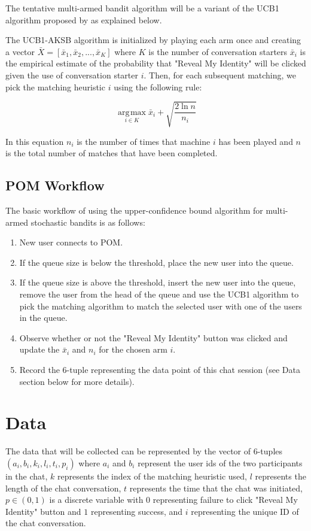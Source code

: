 \documentclass{report}
\DeclareMathOperator*{\argmax}{\arg\!\max}
\begin{document}
The tentative multi-armed bandit algorithm will be a variant of the UCB1 algorithm proposed by \citep{auer02} as explained below.

The UCB1-AKSB algorithm is initialized by playing each arm once and creating a vector $\bar{X} = [\bar{x}_1, \bar{x}_2, ..., \bar{x}_K]$ where $K$ is the number of conversation starters
$\bar{x}_i$ is the empirical estimate of the probability that "Reveal My Identity" will be clicked given the use of conversation starter $i$. Then, for each subsequent matching, we pick the matching heuristic $i$ using the following rule: 

$$ \underset{i \in{K}}{\argmax{}} \bar{x}_i + \sqrt{\frac{2\ln{n}}{n_i}}$$

In this equation $n_i$ is the number of times that machine $i$ has been played and $n$ is the total number of matches that have been completed.

\section{POM Workflow}

The basic workflow of using the upper-confidence bound algorithm for multi-armed stochastic bandits is as follows: 

\begin{enumerate}
\item New user connects to POM.
\item If the queue size is below the threshold, place the new user into the queue.
\item If the queue size is above the threshold, insert the new user into the queue, remove the user from the head of the queue and use the UCB1 algorithm to pick the matching algorithm to match the selected user with one of the users in the queue. 
\item Observe whether or not the "Reveal My Identity" button was clicked and update the $\bar{x}_i$ and $n_i$ for the chosen arm $i$.
\item Record the 6-tuple representing the data point of this chat session (see Data section below for more details).
\end{enumerate}

\chapter{Data}

The data that will be collected can be represented by the vector of 6-tuples $(a_i, b_i, k_i, l_i, t_i, p_i)$ where $a_i$ and $b_i$ represent the user ids of the two participants in the chat, $k$ represents the index of the matching heuristic used, $l$ represents the length of the chat conversation, $t$ represents the time that the chat was initiated, $p \in{(0, 1)} $ is a discrete variable with $0$ representing failure to click "Reveal My Identity" button and $1$ representing success, and $i$ representing the unique ID of the chat conversation.
\end{document}
